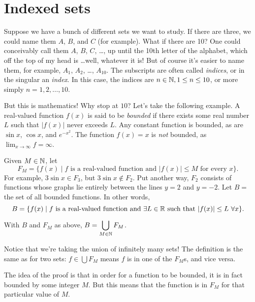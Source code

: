 \documentclass{tufte-book}
\begin{document}
\section{Indexed sets}
\label{sec:indexed-sets}

Suppose we have a bunch of different sets we want to study. If there are three, we could name them $A$, $B$, and $C$ (for example). What if there are 10? One could conceivably call them $A$, $B$, $C$, \dots, up until the 10th letter of the alphabet, which off the top of my head is \dots well, whatever it is! But of course it's easier to name them, for example, $A_1$, $A_2$, \dots, $A_{10}$. The subscripts are often called \emph{indices}, or in the singular an \emph{index}. In this case, the indices are $n \in \mathbb{N}, 1 \leq n \leq 10$, or more simply $n = 1, 2, \dots, 10$.

But this is mathematics! Why stop at $10$? Let's take the following example. A real-valued function $f(x)$ is said to be \emph{bounded} if there exists some real number $L$ such that $|f(x)|$ never exceeds $L$. Any constant function is bounded, as are $\sin x$, $\cos x$, and $e^{-x^2}$. The function $f(x) = x$ is \emph{not} bounded, as $\lim_{x \to \infty} f = \infty$.

Given $M \in \mathbb{N}$, let 
\[
F_M = \{f(x) \mid f \text{ is a real-valued function and } |f(x)| \leq M \text{ for every } x\}.
\]
For example, $3\sin x \in F_3$, but $3\sin x \notin F_2$. Put another way, $F_2$ consists of functions whose graphs lie entirely between the lines $y = 2$ and $y = -2$. Let $B = $ the set of all bounded functions. In other words,
\[
B = \{f(x) \mid f \text{ is a real-valued function and } \exists L \in \mathbb{R} \text{ such that } |f(x)| \leq L \, \, \forall x\}.
\]

\begin{claim}
  With $B$ and $F_M$ as above, $B = \displaystyle\bigcup_{M \in \mathbb{N}} F_M$. 
\end{claim}
Notice that we're taking the union of infinitely many sets! The definition is the same as for two sets: $f \in \bigcup F_M$ means $f$ is in one of the $F_M$s, and vice versa.

The idea of the proof is that in order for a function to be bounded, it is in fact bounded by some integer $M$. But this means that the function is in $F_M$ for that particular value of $M$. 
\end{document}
